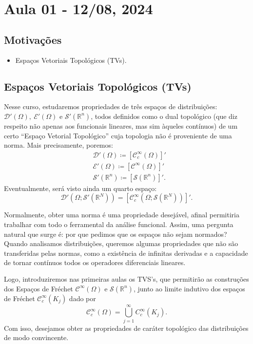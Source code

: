 \documentclass[../distribution_theory_notes.tex]{subfiles}
\begin{document}
\section{Aula 01 - 12/08, 2024}
\subsection{Motivações}
\begin{itemize}
	\item Espaços Vetoriais Topológicos (TVs).
\end{itemize}
\subsection{Espaços Vetoriais Topológicos (TVs)}
Nesse curso, estudaremos propriedades de três espaços de distribuições: \(\mathcal{D'}(\Omega ),\: \mathcal{E'}(\Omega )\) e \(\mathcal{S'}(\mathbb{R}^{n})\), todos definidos
como o dual topológico (que diz respeito não apenas aos funcionais lineares, mas sim àqueles contínuos) de um certo ``Espaço Vetorial Topológico'' cuja topologia não é proveniente de uma norma.
Mais precisamente, poremos:
\begin{align*}
	 & \mathcal{D'}(\Omega )\coloneqq [\mathcal{C}_{c}^{\infty}(\Omega )]'   \\
	 & \mathcal{E'}(\Omega )\coloneqq [\mathcal{C}^{\infty}(\Omega )]'       \\
	 & \mathcal{S'}(\mathbb{R}^{n})\coloneqq [\mathcal{S}(\mathbb{R}^{n})]'.
\end{align*}
Eventualmente, será visto ainda um quarto espaço:
\[
	\mathcal{D'}(\Omega ; \mathcal{S'}(\mathbb{R}^{N})) = [\mathcal{C}_{c}^{\infty}(\Omega ; \mathcal{S}(\mathbb{R}^{N}))]'.
\]

Normalmente, obter uma norma é uma propriedade desejável, afinal permitiria trabalhar com todo o ferramental da análise funcional. Assim, uma pergunta natural que surge é: por que pedimos que os espaços não sejam normados?
Quando analisamos distribuições, queremos algumas propriedades que não são transferidas pelas normas, como a existência de infinitas derivadas e a capacidade de tornar contínuos todos os operadores diferenciais lineares.

Logo, introduziremos nas primeiras aulas os TVS's, que permitirão as construções dos Espaços de Fréchet \(\mathcal{C}^{\infty}(\Omega )\) e \(\mathcal{S}(\mathbb{R}^{n})\), junto ao limite indutivo dos espaços de Fréchet \(\mathcal{C}_{c}^{\infty}(K_{j})\)
dado por
\[
	\mathcal{C}_{c}^{\infty}(\Omega )=\bigcup_{j=1}^{\infty}C_{c}^{\infty}(K_{j}).
\]
Com isso, desejamos obter as propriedades de caráter topológico das distribuições de modo convincente.
\end{document}

